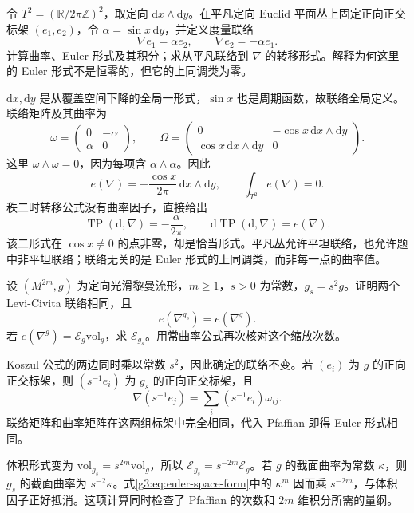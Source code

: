 \begin{exercise}\label{g3:ex:trivial-plane-nonzero-euler-form}
	令 \(T^2=(\mathbb R/2\pi\mathbb Z)^2\)，取定向 \(\mathrm dx\wedge\mathrm dy\)。在平凡定向 Euclid 平面丛上固定正向正交标架 \((e_1,e_2)\)，令 \(\alpha=\sin x\,\mathrm dy\)，并定义度量联络
	\[
		\nabla e_1=\alpha e_2,\qquad \nabla e_2=-\alpha e_1.
	\]
	计算曲率、Euler 形式及其积分；求从平凡联络到 \(\nabla\) 的转移形式。解释为何这里的 Euler 形式不是恒零的，但它的上同调类为零。
\end{exercise}
\begin{solution}
	\(\mathrm dx,\mathrm dy\) 是从覆盖空间下降的全局一形式，\(\sin x\) 也是周期函数，故联络全局定义。联络矩阵及其曲率为
	\[
		\omega=\begin{pmatrix}0&-\alpha\\\alpha&0\end{pmatrix},\qquad
		\Omega=\begin{pmatrix}0&-\cos x\,\mathrm dx\wedge\mathrm dy\\
		\cos x\,\mathrm dx\wedge\mathrm dy&0\end{pmatrix}.
	\]
	这里 \(\omega\wedge\omega=0\)，因为每项含 \(\alpha\wedge\alpha\)。因此
	\[
		e(\nabla)=-\frac{\cos x}{2\pi}\,\mathrm dx\wedge\mathrm dy,
		\qquad \int_{T^2}e(\nabla)=0.
	\]
	秩二时转移公式没有曲率因子，直接给出
	\[
		\operatorname{TP}(\mathrm d,\nabla)=-\frac{\alpha}{2\pi},\qquad
		\mathrm d\operatorname{TP}(\mathrm d,\nabla)=e(\nabla).
	\]
	该二形式在 \(\cos x\ne0\) 的点非零，却是恰当形式。平凡丛允许平坦联络，也允许题中非平坦联络；联络无关的是 Euler 形式的上同调类，而非每一点的曲率值。
\end{solution}

\begin{exercise}\label{g3:ex:euler-metric-scaling}
	设 \((M^{2m},g)\) 为定向光滑黎曼流形，\(m\ge1\)，\(s>0\) 为常数，\(g_s=s^2g\)。证明两个 Levi-Civita 联络相同，且
	\[
		e(\nabla^{g_s})=e(\nabla^g).
	\]
	若 \(e(\nabla^g)=\mathcal E_g\mathrm{vol}_g\)，求 \(\mathcal E_{g_s}\)。用常曲率公式再次核对这个缩放次数。
\end{exercise}
\begin{solution}
	Koszul 公式的两边同时乘以常数 \(s^2\)，因此确定的联络不变。若 \((e_i)\) 为 \(g\) 的正向正交标架，则 \((s^{-1}e_i)\) 为 \(g_s\) 的正向正交标架，且
	\[
		\nabla(s^{-1}e_j)=\sum_i(s^{-1}e_i)\omega_{ij}.
	\]
	联络矩阵和曲率矩阵在这两组标架中完全相同，代入 Pfaffian 即得 Euler 形式相同。

	体积形式变为 \(\mathrm{vol}_{g_s}=s^{2m}\mathrm{vol}_g\)，所以
	\(\mathcal E_{g_s}=s^{-2m}\mathcal E_g\)。若 \(g\) 的截面曲率为常数 \(\kappa\)，则 \(g_s\) 的截面曲率为 \(s^{-2}\kappa\)。式\eqref{g3:eq:euler-space-form}中的 \(\kappa^m\) 因而乘 \(s^{-2m}\)，与体积因子正好抵消。这项计算同时检查了 Pfaffian 的次数和 \(2m\) 维积分所需的量纲。
\end{solution}

